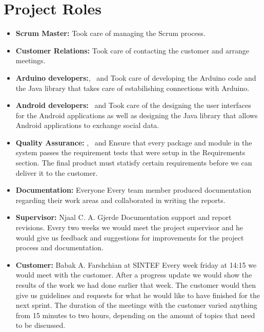 \section{Project Roles}
\begin{itemize}
	\item \textbf{Scrum Master:} \henrik\newline
	Took care of managing the Scrum process.
	
	\item \textbf{Customer Relations:} \henrik\newline
	Took care of contacting the customer and arrange meetings.

	\item \textbf{Arduino developers:}\anders, \bjornar ~and \johan\newline
	Took care of developing the Arduino code and the Java library that takes
	care of estabilishing connections with Arduino.

	\item \textbf{Android developers:}  \emanuele~and \henrik\newline
	Took care of the designing the user interfaces for the Android applications
	as well as designing the Java library that allows Android applications
	to exchange social data.
	
	\item \textbf{Quality Assurance:} \johan, \asbjorn~and \jonas\newline
	Ensure that every package and module in the system passes the requirement tests
	that were setup in the Requirements section. The final product must statisfy certain
	requirements before we can deliver it to the customer.

	\item \textbf{Documentation:} Everyone\newline
	Every team member produced documentation regarding their work areas and
	collaborated in writing the reports.

	\item \textbf{Supervisor:} Njaal C. A. Gjerde\newline
	Documentation support and report revisions. Every two weeks we would meet the project supervisor
 	and he would give us feedback and suggestions for improvements for the project process and documentation.

	\item \textbf{Customer:} Babak A. Farshchian at SINTEF \newline
	Every week friday at 14:15 we would meet with the customer. After a progress update we would show the results
	of the work we had done earlier that week. The customer would then give us guidelines and requests for what
	he would like to have finished for the next sprint. The duration of the meetings with the customer varied anything
	from 15 minutes to two hours, depending on the amount of topics that need to be discussed.
\end{itemize}

